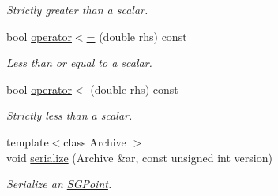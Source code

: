 \begin{DoxyCompactItemize}
\begin{DoxyCompactList}\small\item\em Strictly greater than a scalar. \end{DoxyCompactList}\item 
\hypertarget{classSGPoint_a384afaac3364f0700cbdd4ea57f3a266}{bool \hyperlink{classSGPoint_a384afaac3364f0700cbdd4ea57f3a266}{operator$<$=} (double rhs) const }\label{classSGPoint_a384afaac3364f0700cbdd4ea57f3a266}

\begin{DoxyCompactList}\small\item\em Less than or equal to a scalar. \end{DoxyCompactList}\item 
\hypertarget{classSGPoint_a47fbe85777b1e972ede0d239d163b07b}{bool \hyperlink{classSGPoint_a47fbe85777b1e972ede0d239d163b07b}{operator$<$} (double rhs) const }\label{classSGPoint_a47fbe85777b1e972ede0d239d163b07b}

\begin{DoxyCompactList}\small\item\em Strictly less than a scalar. \end{DoxyCompactList}\item 
\hypertarget{classSGPoint_a1fbc1552f839d84bbcac667c768e9726}{{\footnotesize template$<$class Archive $>$ }\\void \hyperlink{classSGPoint_a1fbc1552f839d84bbcac667c768e9726}{serialize} (Archive \&ar, const unsigned int version)}\label{classSGPoint_a1fbc1552f839d84bbcac667c768e9726}

\begin{DoxyCompactList}\small\item\em Serialize an \hyperlink{classSGPoint}{S\-G\-Point}. \end{DoxyCompactList}\end{DoxyCompactItemize}
